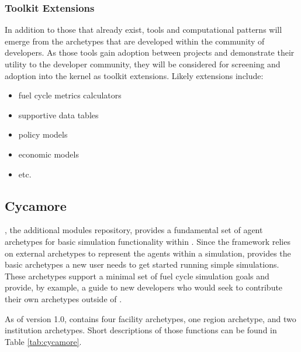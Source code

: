 \subsubsection{Toolkit Extensions}

In addition to those that already exist, tools and computational patterns will 
emerge from the archetypes that are developed within the community of 
developers. As those tools gain adoption between projects and demonstrate their 
utility to the developer community, they will be considered for screening and 
adoption into the kernel as toolkit extensions. Likely extensions include:

\begin{itemize}
\item fuel cycle metrics calculators
\item supportive data tables
\item policy models
\item economic models
\item etc.
\end{itemize}

\subsection{Cycamore}

\Cycamore \cite{carlsen_cycamore_2014}, the \Cyclus additional modules 
repository, provides a fundamental set of agent archetypes for basic simulation 
functionality within \Cyclus.  Since the \Cyclus framework relies on external 
archetypes to represent the agents within a simulation, \Cycamore provides the 
basic archetypes a new user needs to get started running simple simulations.  
These archetypes support a minimal set of fuel cycle simulation goals and 
provide, by example, a guide to new developers who would seek to contribute 
their own archetypes outside of \Cycamore.

As of version 1.0, \Cycamore contains four facility archetypes, one region 
archetype, and two institution archetypes. Short descriptions of those 
functions can be found in Table \ref{tab:cycamore}.


